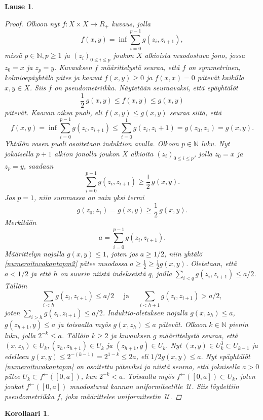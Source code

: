 \documentclass[12pt,a4paper,leqno]{report}
\newcommand{\N}{\mathbb{N}}
\newcommand{\U}{\,\mathcal{U}}
\theoremstyle{plain}
\newtheorem{lause}[equation]{Lause}
\newtheorem{kor}[equation]{Korollaari}
\theoremstyle{definition}
\theoremstyle{remark}
\begin{document}
\begin{lause}
\begin{proof}
Olkoon nyt $f\colon X\times X\rightarrow R_+$ kuvaus, 
jolla 
$$f(x,y)=\inf\sum_{i=0}^{p-1}g(z_i,z_{i+1}),$$
missä $p\in\N,p\geq 1$ ja $(z_i)_{0\leq i\leq p}$ 
joukon $X$ alkioista muodostuva jono, jossa $z_0=x$ ja $z_p=y$. 
Kuvauksen $f$ määrittelystä seuraa, 
että $f$ on symmetrinen, kolmioepäyhtälö pätee ja kaavat 
$f(x,y)\geq 0$ ja $f(x,x)=0$ pätevät kaikilla $x,y\in X$.
Siis $f$ on pseudometriikka. 
Näytetään seuraavaksi, että epäyhtälöt 
\begin{equation}\label{numeroituvakantapm}
\frac{1}{2}\,g(x,y)\leq f(x,y)\leq g(x,y)
\end{equation}
pätevät. 
Kaavan oikea puoli, eli $f(x,y)\leq g(x,y)$ seuraa siitä, 
että 
$$f(x,y)=\inf\sum_{i=0}^{p-1}g(z_i,z_{i+1})\leq\sum_{i=0}^1g(z_i,z_i+1)=g(z_0,z_1)=g(x,y).$$
Yhtälön vasen puoli osoitetaan induktion avulla. 
Olkoon $p\in\N$ luku. 
Nyt jokaisella $p+1$ alkion jonolla joukon $X$ 
alkioita $ (z_i)_{0\leq i\leq p}$, 
jolla $z_0=x$ ja $z_p=y$, saadaan 
\begin{equation}\label{numeroituvakantapm2}
\sum_{i=0}^{p-1}g(z_i,z_{i+1})\geq \frac{1}{2}\,g(x,y).
\end{equation}
Jos $p=1$, niin summassa on vain yksi termi
$$g(z_0,z_{1})=g(x,y)\geq \frac{1}{2}\,g(x,y).$$
Merkitään 
$$a=\sum_{i=0}^{p-1}g(z_i,z_{i+1}).$$
Määrittelyn nojalla $g(x,y)\leq 1$, joten jos $a\geq 1/2$, 
niin yhtälö \ref{numeroituvakantapm2} pätee muodossa 
$a\geq \frac{1}{2}\geq \frac{1}{2}g(x,y)$. 
Oletetaan, että $a<1/2$ ja että $h$ on suurin niistä indekseistä $q$, 
joilla $\sum_{i<q}g(z_i,z_{i+1})\leq a/2$. 
Tällöin $$\sum_{i<h}g(z_i,z_{i+1})\leq a/2\quad\text{ ja }\quad
\sum_{i<h+1}g(z_i,z_{i+1})> a/2,$$ 
joten $\sum_{i>h}g(z_i,z_{i+1})\leq a/2$. 
Induktio-oletuksen nojalla $g(x,z_h)\leq a$, $g(z_{h+1},y)\leq a$ ja 
toisaalta myös $g(x,z_h)\leq a$ pätevät. 
Olkoon $k\in \N$ pienin luku, jolla $2^{-k}\leq a$. 
Tällöin $k\geq 2$ ja kuvauksen $g$ määrittelystä seuraa, että 
$(x,z_h)\in U_k,(z_h,z_{h+1})\in U_k$ ja $(z_{h+1},y)\in U_k$. 
Nyt $(x,y)\in U_k^3\subset U_{k-1}$ ja edelleen 
$g(x,y)\leq 2^{-(k-1)}=2^{1-k}\leq 2a$, eli $1/2g(x,y)\leq a.$ 
Nyt epäyhtälöt \ref{numeroituvakantapm} on osoitettu päteviksi ja 
niistä seuraa, että jokaisella $a>0$ pätee 
$U_k\subset f^\leftarrow([0,a])$, kun $2^{-k}<a$. 
Toisaalta myös $f^\leftarrow([0,a])\subset U_k$, 
joten joukot $f^\leftarrow([0,a])$ muodostavat kannan uniformiteetille $\U$. 
Siis löydettiin pseudometriikka $f$, joka määrittelee uniformiteetin $\U$.
\end{proof}
\end{lause}
\begin{kor}
\end{kor}
%
%
\end{document}
